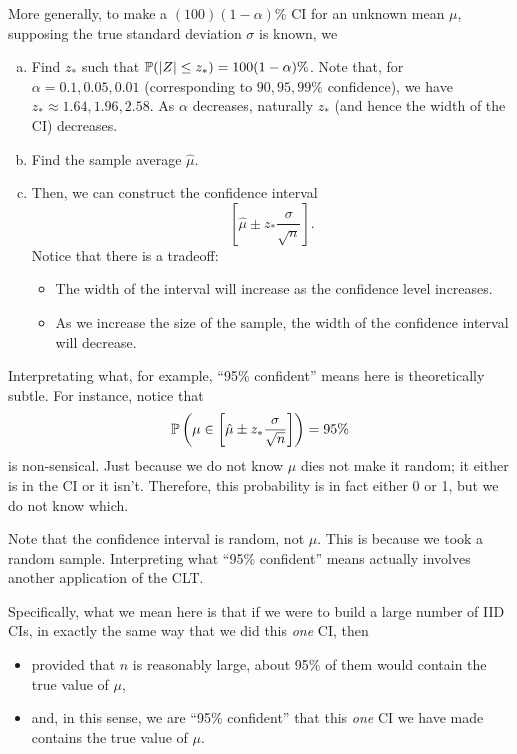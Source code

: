 \documentclass[letterpaper]{article}
\begin{document}
More generally, to make a $(100)(1 - \alpha)\%$ CI for an unknown mean $\mu$, supposing the true standard deviation $\sigma$ is known, we 
\begin{enumerate}[(a)]
    \item Find $z_*$ such that $\mathbb{P}(|Z| \leq z_*) = 100(1 - \alpha)\%$. Note that, for $\alpha = 0.1, 0.05, 0.01$ (corresponding to $90, 95, 99\%$ confidence), we have $z_* \approx 1.64, 1.96, 2.58$. As $\alpha$ decreases, naturally $z_*$ (and hence the width of the CI) decreases. 
    \item Find the sample average $\hat{\mu}$. 
    \item Then, we can construct the confidence interval 
    \[\left[\hat{\mu} \pm z_* \frac{\sigma}{\sqrt{n}}\right].\]
    Notice that there is a tradeoff:
    \begin{itemize}
        \item The width of the interval will increase as the confidence level increases. 
        \item As we increase the size of the sample, the width of the confidence interval will decrease.  
    \end{itemize}
\end{enumerate}
Interpretating what, for example, ``95\% confident'' means here is theoretically subtle. For instance, notice that 
\[\mathbb{P}\left(\mu \in \left[\hat{\mu} \pm z_* \frac{\sigma}{\sqrt{n}}\right]\right) = 95\%\]
is non-sensical. Just because we do not know $\mu$ dies not make it random; it either is in the CI or it isn't. Therefore, this probability is in fact either 0 or 1, but we do not know which. 

\bigskip 

Note that the confidence interval is random, not $\mu$. This is because we took a random sample. Interpreting what ``95\% confident'' means actually involves another application of the CLT. 

\bigskip 

Specifically, what we mean here is that if we were to build a large number of IID CIs, in exactly the same way that we did this \emph{one} CI, then 
\begin{itemize}
    \item provided that $n$ is reasonably large, about 95\% of them would contain the true value of $\mu$,
    \item and, in this sense, we are ``95\% confident'' that this \emph{one} CI we have made contains the true value of $\mu$. 
\end{itemize}
\end{document}
